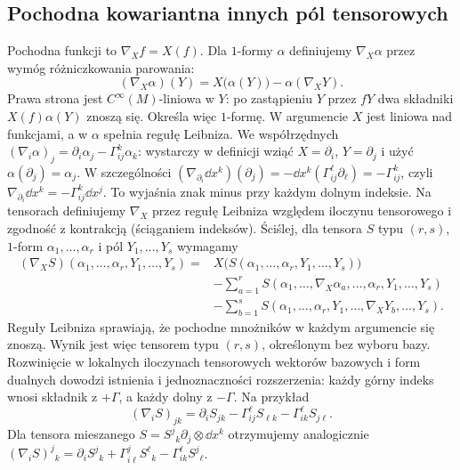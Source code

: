 \subsection*{Pochodna kowariantna innych pól tensorowych}
Pochodna funkcji to $\nabla_X f=X(f)$. Dla
$1$-formy $\alpha$ definiujemy $\nabla_X\alpha$
przez wymóg różniczkowania parowania:
\begin{equation}\label{eq:pochodna-kowariantna-forma}
 (\nabla_X\alpha)(Y)
  =X\bigl(\alpha(Y)\bigr)-\alpha(\nabla_XY).
\end{equation}
Prawa strona jest $C^\infty(M)$-liniowa w $Y$: po
zastąpieniu $Y$ przez $fY$ dwa składniki $X(f)\alpha(Y)$
znoszą się. Określa więc $1$-formę. W argumencie $X$
jest liniowa nad funkcjami, a w $\alpha$ spełnia regułę
Leibniza. We współrzędnych
$(\nabla_i\alpha)_j=\partial_i\alpha_j
-\Gamma^k_{ij}\alpha_k$: wystarczy w definicji wziąć
$X=\partial_i$, $Y=\partial_j$ i użyć
$\alpha(\partial_j)=\alpha_j$.
W szczególności
$(\nabla_{\partial_i}\dd x^k)(\partial_j)
=-\dd x^k(\Gamma^\ell_{ij}\partial_\ell)
=-\Gamma^k_{ij}$, czyli
$\nabla_{\partial_i}\dd x^k=-\Gamma^k_{ij}\dd x^j$.
To wyjaśnia znak minus przy każdym dolnym indeksie.
Na tensorach
definiujemy $\nabla_X$ przez regułę Leibniza
względem iloczynu tensorowego i zgodność
z kontrakcją (ściąganiem indeksów). Ściślej, dla tensora
$S$ typu $(r,s)$, $1$-form $\alpha_1,\ldots,\alpha_r$
i pól $Y_1,\ldots,Y_s$ wymagamy
\begin{align*}
 (\nabla_XS)(\alpha_1,\ldots,\alpha_r,Y_1,\ldots,Y_s)
 ={}&X\bigl(S(\alpha_1,\ldots,\alpha_r,Y_1,\ldots,Y_s)\bigr)\\
 &-\sum_{a=1}^r S(\alpha_1,\ldots,\nabla_X\alpha_a,\ldots,
                         \alpha_r,Y_1,\ldots,Y_s)\\
 &-\sum_{b=1}^s S(\alpha_1,\ldots,\alpha_r,
                         Y_1,\ldots,\nabla_XY_b,\ldots,Y_s).
\end{align*}
Reguły Leibniza sprawiają, że pochodne mnożników
w każdym argumencie się znoszą. Wynik jest więc tensorem
typu $(r,s)$, określonym bez wyboru bazy. Rozwinięcie
w lokalnych iloczynach tensorowych wektorów bazowych
i form dualnych dowodzi istnienia i jednoznaczności
rozszerzenia: każdy górny indeks wnosi składnik z $+\Gamma$,
a każdy dolny z $-\Gamma$. Na przykład
\[
 (\nabla_i S)_{jk}
 =\partial_iS_{jk}
  -\Gamma^\ell_{ij}S_{\ell k}
  -\Gamma^\ell_{ik}S_{j\ell}.
\]
Dla tensora mieszanego $S=S^j{}_k\partial_j\otimes\dd x^k$
otrzymujemy analogicznie
$(\nabla_iS)^j{}_k
=\partial_iS^j{}_k+\Gamma^j_{i\ell}S^\ell{}_k
-\Gamma^\ell_{ik}S^j{}_\ell$.
